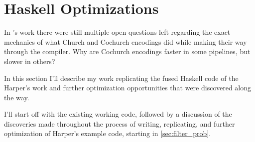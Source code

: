
\section{Haskell Optimizations}\label{sec:haskell}
In \cite{Harper2011}'s work there were still multiple open questions left regarding the exact mechanics of what Church and Cochurch encodings did while making their way through the compiler. Why are Cochurch encodings faster in some pipelines, but slower in others?

In this section I'll describe my work replicating the fused Haskell code of the Harper's work and further optimization opportunities that were discovered along the way.

I'll start off with the existing working code, followed by a discussion of the discoveries made throughout the process of writing, replicating, and further optimization of Harper's example code, starting in \autoref{sec:filter_prob}.

